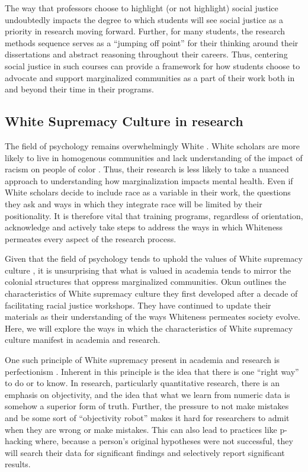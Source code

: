\documentclass[
  11pt,
]{book}
\begin{document}
The way that professors choose to highlight (or not highlight) social justice undoubtedly impacts the degree to which students will see social justice as a priority in research moving forward. Further, for many students, the research methods sequence serves as a ``jumping off point'' for their thinking around their dissertations and abstract reasoning throughout their careers. Thus, centering social justice in such courses can provide a framework for how students choose to advocate and support marginalized communities as a part of their work both in and beyond their time in their programs.

\subsection{White Supremacy Culture in research}\label{white-supremacy-culture-in-research}

The field of psychology remains overwhelmingly White \citep{dupree_psychological_2022}. White scholars are more likely to live in homogenous communities and lack understanding of the impact of racism on people of color \citep{dupree_psychological_2022}. Thus, their research is less likely to take a nuanced approach to understanding how marginalization impacts mental health. Even if White scholars decide to include race as a variable in their work, the questions they ask and ways in which they integrate race will be limited by their positionality. It is therefore vital that training programs, regardless of orientation, acknowledge and actively take steps to address the ways in which Whiteness permeates every aspect of the research process.

Given that the field of psychology tends to uphold the values of White supremacy culture \citep{dupree_psychological_2022}, it is unsurprising that what is valued in academia tends to mirror the colonial structures that oppress marginalized communities. Okun \citeyearpar{okun_white_2021} outlines the characteristics of White supremacy culture they first developed after a decade of facilitating racial justice workshops. They have continued to update their materials as their understanding of the ways Whiteness permeates society evolve. Here, we will explore the ways in which the characteristics of White supremacy culture manifest in academia and research.

One such principle of White supremacy present in academia and research is perfectionism \citep{okun_white_2021}. Inherent in this principle is the idea that there is one ``right way'' to do or to know. In research, particularly quantitative research, there is an emphasis on objectivity, and the idea that what we learn from numeric data is somehow a superior form of truth. Further, the pressure to not make mistakes and be some sort of ``objectivity robot'' makes it hard for researchers to admit when they are wrong or make mistakes. This can also lead to practices like p-hacking \citep{field_discovering_2012} where, because a person's original hypotheses were not successful, they will search their data for significant findings and selectively report significant results.
\end{document}
